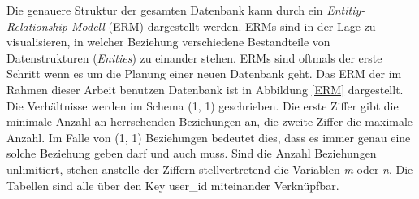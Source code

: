 \documentclass[a4paper,11pt]{report}
\begin{document}
				Die genauere Struktur der gesamten Datenbank kann durch ein \emph{Entitiy-Relationship-Modell} (ERM) dargestellt werden. ERMs sind in der Lage zu visualisieren, in welcher Beziehung verschiedene Bestandteile von Datenstrukturen (\emph{Enities}) zu einander stehen. ERMs sind oftmals der erste Schritt wenn es um die Planung einer neuen Datenbank geht. Das ERM der im Rahmen dieser Arbeit benutzen Datenbank ist in Abbildung \ref{ERM} dargestellt. Die Verhältnisse werden im Schema (1, 1) geschrieben. Die erste Ziffer gibt die minimale Anzahl an herrschenden Beziehungen an, die zweite Ziffer die maximale Anzahl. Im Falle von (1, 1) Beziehungen bedeutet dies, dass es immer genau eine solche Beziehung geben darf und auch muss. Sind die Anzahl Beziehungen unlimitiert, stehen anstelle der Ziffern stellvertretend die Variablen \emph{m} oder \emph{n}. Die Tabellen sind alle über den Key user\_id miteinander Verknüpfbar.\cite[S. 750]{IT-Handbuch} \cite{ERM} \cite{ERM2}
				
				
				
\end{document}
